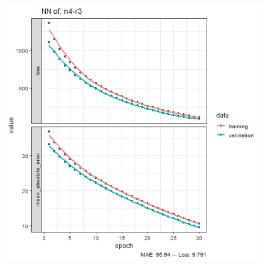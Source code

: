 \documentclass{FR16}
\begin{document}
\begin{figure}[!htb]
\begin{minipage}{0.33\textwidth}
   \end{minipage}
   \begin{minipage}{0.33\textwidth}
     \centering
     \includegraphics[width=1\linewidth]{figures/NN-n4-r3.png} 
   \end{minipage}\hfill
 


\end{figure}
\end{document}
